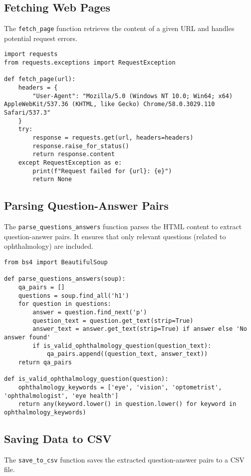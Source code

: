 \documentclass[a4paper,12pt]{article}
\begin{document}
\subsection{Fetching Web Pages}
The \texttt{fetch\_page} function retrieves the content of a given URL and handles potential request errors.

\begin{lstlisting}
import requests
from requests.exceptions import RequestException

def fetch_page(url):
    headers = {
        "User-Agent": "Mozilla/5.0 (Windows NT 10.0; Win64; x64) AppleWebKit/537.36 (KHTML, like Gecko) Chrome/58.0.3029.110 Safari/537.3"
    }
    try:
        response = requests.get(url, headers=headers)
        response.raise_for_status()
        return response.content
    except RequestException as e:
        print(f"Request failed for {url}: {e}")
        return None
\end{lstlisting}

\subsection{Parsing Question-Answer Pairs}
The \texttt{parse\_questions\_answers} function parses the HTML content to extract question-answer pairs. It ensures that only relevant questions (related to ophthalmology) are included.

\begin{lstlisting}
from bs4 import BeautifulSoup

def parse_questions_answers(soup):
    qa_pairs = []
    questions = soup.find_all('h1')
    for question in questions:
        answer = question.find_next('p')
        question_text = question.get_text(strip=True)
        answer_text = answer.get_text(strip=True) if answer else 'No answer found'
        if is_valid_ophthalmology_question(question_text):
            qa_pairs.append((question_text, answer_text))
    return qa_pairs

def is_valid_ophthalmology_question(question):
    ophthalmology_keywords = ['eye', 'vision', 'optometrist', 'ophthalmologist', 'eye health']
    return any(keyword.lower() in question.lower() for keyword in ophthalmology_keywords)
\end{lstlisting}

\subsection{Saving Data to CSV}
The \texttt{save\_to\_csv} function saves the extracted question-answer pairs to a CSV file.
\end{document}
